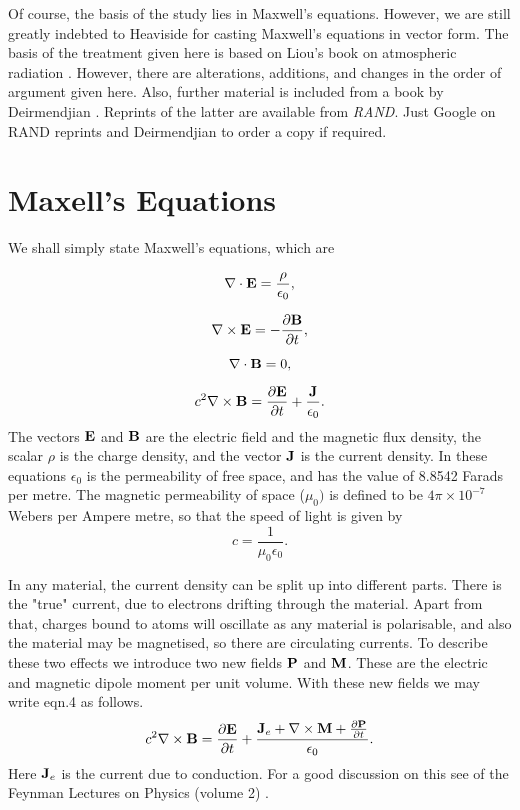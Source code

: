 Of course, the basis of the study lies in Maxwell's equations. However, we are still greatly indebted to Heaviside for casting Maxwell's equations in vector form. The basis of the treatment given here is based on Liou's book on atmospheric radiation \cite{Liou:Mybib}. However, there are alterations, additions, and changes in the order of argument given here. Also, further material is included from  a book by Deirmendjian \cite{Deirmendjian:Mybib}. Reprints of the latter are available from {\it RAND}. Just Google on RAND reprints and Deirmendjian to order a copy if required.

\section{Maxell's Equations}

We shall simply state Maxwell's equations, which  are

\begin{equation}
 \nabla \cdot {\bf E}=\frac{\rho}{\epsilon_0},
\end{equation}

\begin{equation}
\nabla \times {\bf E}=-\frac{\partial {\bf B}}{\partial t},
\end{equation}

\begin{equation}
 \nabla \cdot {\bf B}=0,
\end{equation}

\begin{equation}
c^2 \nabla \times {\bf B}=\frac{\partial {\bf E}}{\partial t} +\frac{{\bf J}}{\epsilon_0}.
\end{equation}
The vectors ${\bf E }$ and ${\bf B}$ are the electric field and the magnetic flux density, the scalar $\rho$ is the charge density, and the vector ${\bf J}$
is the current density. In these equations $\epsilon_0$ is the permeability of free space, and has the value of 8.8542 Farads per metre. The magnetic permeability of space ($\mu_0)$ is defined to be $4 \pi \times 10^{-7}$ Webers per Ampere metre, so that the speed of light is given by
\begin{equation}
c =\frac{1}{ \mu_0 \epsilon_0}.
\end{equation}

In any material, the current density can be split up into different parts.
There is the "true" current, due to electrons drifting through the material.
Apart from that, charges bound to atoms will oscillate as any material is polarisable, and also the material may be magnetised, so there are circulating currents. To describe these two effects we introduce two new fields
 ${\bf P}$ and ${\bf M}$. These are the electric and magnetic dipole moment per unit volume. 
With these new fields we may write eqn.4 as follows.
\begin{equation}
c^2 \nabla \times {\bf B}=\frac{\partial {\bf E}}{\partial t} 
+\frac{
{\bf J}_e + \nabla \times {\bf M}+\frac{\partial {\bf P}}{\partial t}
}{\epsilon_0}.
\end{equation}
Here ${\bf J}_e$ is the current due to conduction. For a good discussion on this
see  of the Feynman Lectures on Physics (volume 2) \cite{FeynLect:Mybib}.

